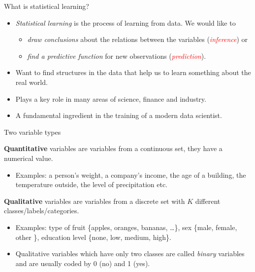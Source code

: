 \documentclass[
  ignorenonframetext,
]{beamer}
\providecommand{\tightlist}{%
  \setlength{\itemsep}{0pt}\setlength{\parskip}{0pt}}
\begin{document}
\begin{frame}{What is statistical learning?}
\protect\hypertarget{what-is-statistical-learning}{}
\begin{itemize}
\item
  \emph{Statistical learning} is the process of learning from data. We
  would like to

  \begin{itemize}
  \tightlist
  \item
    \emph{draw conclusions} about the relations between the variables
    (\emph{\textcolor{red}{inference}}) or
  \item
    \emph{find a predictive function} for new observations
    (\emph{\textcolor{red}{prediction}}).
  \end{itemize}
\item
  Want to find structures in the data that help us to learn something
  about the real world.
\item
  Plays a key role in many areas of science, finance and industry.
\item
  A fundamental ingredient in the training of a modern data scientist.
\end{itemize}
\end{frame}

\begin{frame}
\begin{block}{Two variable types}
\protect\hypertarget{two-variable-types}{}
\vspace{2mm}

\textbf{Quantitative} variables are variables from a continuous set,
they have a numerical value.

\begin{itemize}
\tightlist
\item
  Examples: a person's weight, a company's income, the age of a
  building, the temperature outside, the level of precipitation etc.
\end{itemize}

\vspace{4mm}

\textbf{Qualitative} variables are variables from a discrete set with
\(K\) different classes/labels/categories.

\begin{itemize}
\item
  Examples: type of fruit \{apples, oranges, bananas, \ldots\}, sex
  \{male, female, other \}, education level \{none, low, medium, high\}.
\item
  Qualitative variables which have only two classes are called
  \emph{binary} variables and are usually coded by 0 (no) and 1 (yes).
\end{itemize}
\end{block}
\end{frame}
\end{document}
